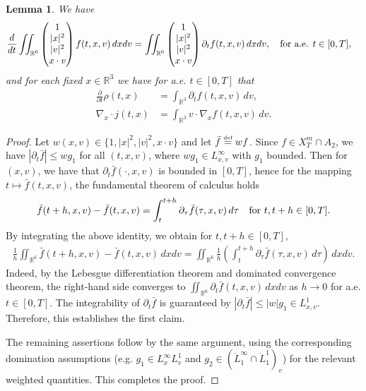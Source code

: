 \documentclass[reqno,11pt,final]{amsart}
\theoremstyle{plain}
\newtheorem{lemma}[theorem]{Lemma}
\numberwithin{equation}{section}
\numberwithin{theorem}{section}
\newcommand{\eqdef }{\overset{\mbox{\tiny{def}}}{=}}
\begin{document}
\begin{lemma}\label{intch}
    We have
    \begin{align*}
        \frac{d}{dt}\iint_{\mathbb{R}^6} 
        \begin{pmatrix}
        1\\
        |x|^2\\
        |v|^2\\
        x\cdot v
        \end{pmatrix}f(t,x,v)\,dxdv &= \iint_{\mathbb{R}^6} \begin{pmatrix}
        1\\
        |x|^2\\
        |v|^2\\
        x\cdot v
        \end{pmatrix}\partial_tf(t,x,v)\,dxdv, \quad \textup{for a.e. } t\in[0,T],
    \end{align*}and for each fixed $x\in\mathbb{R}^3$ we have for a.e. $t\in[0,T]$ that
    \begin{align*}
        \frac{\partial}{\partial t}\rho(t,x) &= \int_{\mathbb{R}^3} \partial_tf(t,x,v)\,dv,\\
        \nabla_x \cdot j(t,x) &= \int_{\mathbb{R}^3} v\cdot\nabla_xf(t,x,v)\,dv.
    \end{align*}
\end{lemma}

\begin{proof}
    Let $w(x,v)\in \{1, |x|^2, |v|^2, x\cdot v\}$ and let $\bar{f} \eqdef wf$. Since $f\in X_T^m\cap A_2$, we have $|\partial_t\bar{f}| \le wg_1$ for all $(t,x,v)$, where $wg_1\in L^\infty_{x,v}$ with $g_1$ bounded. Then for $(x,v)$, we have that $\partial_t\bar{f}(\cdot,x,v)$ is bounded in $[0,T]$, hence for the mapping $t\mapsto \bar{f}(t,x,v)$, the fundamental theorem of calculus holds
    \begin{align*}
        \bar{f}(t+h,x,v) - \bar{f}(t,x,v) = \int_t^{t+h} \partial_{\tau}\bar{f}(\tau,x,v)\,d\tau \quad \textup{for } t,t+h\in[0,T].
    \end{align*}By integrating the above identity, we obtain for $t,t+h\in[0,T]$,
    \begin{align}\label{ftc barf}
        \frac{1}{h}\iint_{\mathbb{R}^6} \bar{f}(t+h,x,v) - \bar{f}(t,x,v)\,dxdv = \iint_{\mathbb{R}^6}\frac{1}{h}\left(\int_t^{t+h}\partial_{\tau}\bar{f}(\tau,x,v)\,d\tau\right)\,dxdv.
    \end{align}Indeed, by the Lebesgue differentiation theorem and dominated convergence theorem, the right-hand side converges to $\iint_{\mathbb{R}^6} \partial_t\bar{f}(t,x,v)\,dxdv$ as $h\to0$ for a.e. $t\in[0,T]$. The integrability of $\partial_t \bar{f}$ is guaranteed by $|\partial_t\bar{f}|\le |w|g_1\in L^1_{x,v}$. Therefore, this establishes the first claim.

    The remaining assertions follow by the same argument, using the corresponding domination assumptions (e.g. $g_1\in L^\infty_xL^1_v$ and $g_2\in (\dot{L}^\infty_1\cap\dot{L}^1_{1})_v$) for the relevant weighted quantities. This completes the proof.
\end{proof}
\end{document}
